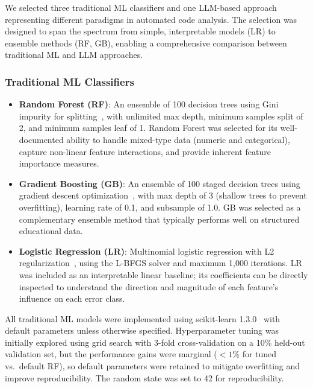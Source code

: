 \documentclass[10pt,a4paper]{article}
\begin{document}
We selected three traditional ML classifiers and one LLM-based approach
representing different paradigms in automated code analysis. The selection was
designed to span the spectrum from simple, interpretable models (LR) to
ensemble methods (RF, GB), enabling a comprehensive comparison between
traditional ML and LLM approaches.

\subsubsection*{Traditional ML Classifiers}
\begin{itemize}
    \item \textbf{Random Forest (RF)}: An ensemble of 100 decision trees using
          Gini impurity for splitting~\cite{breiman2001random}, with unlimited
          max depth, minimum samples split of 2, and minimum samples leaf of 1.
          Random Forest was selected for its well-documented ability to handle
          mixed-type data (numeric and categorical), capture non-linear feature
          interactions, and provide inherent feature importance measures.
    \item \textbf{Gradient Boosting (GB)}: An ensemble of 100 staged
          decision trees using gradient descent
          optimization~\cite{friedman2001greedy}, with max depth
          of 3 (shallow trees to prevent overfitting), learning rate of 0.1,
          and subsample of 1.0. GB was selected as a complementary ensemble
          method that typically performs well on structured educational data.
    \item \textbf{Logistic Regression (LR)}: Multinomial logistic regression
          with L2 regularization~\cite{hosmer2013logistic}, using the L-BFGS
          solver and maximum 1,000 iterations. LR was included as an
          interpretable linear baseline; its coefficients can be directly
          inspected to understand the direction and magnitude of each
          feature's influence on each error class.
\end{itemize}

All traditional ML models were implemented using scikit-learn
1.3.0~\cite{pedregosa2011scikit} with default parameters unless otherwise
specified. Hyperparameter tuning was initially explored using grid search
with 3-fold cross-validation on a 10\% held-out validation set, but the
performance gains were marginal ($< 1\%$ for tuned vs.\ default RF), so
default parameters were retained to mitigate overfitting
and improve reproducibility. The random state was set to 42 for
reproducibility.
\end{document}

